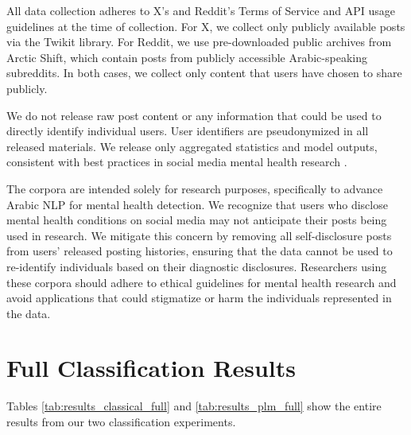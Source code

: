 \documentclass[11pt]{article}
\begin{document}
All data collection adheres to X's and Reddit's Terms of Service and API usage guidelines at the time of collection. For X, we collect only publicly available posts via the Twikit library. For Reddit, we use pre-downloaded public archives from Arctic Shift, which contain posts from publicly accessible Arabic-speaking subreddits. In both cases, we collect only content that users have chosen to share publicly.

We do not release raw post content or any information that could be used to directly identify individual users. User identifiers are pseudonymized in all released materials. We release only aggregated statistics and model outputs, consistent with best practices in social media mental health research \cite{harrigian2021state}.

The corpora are intended solely for research purposes, specifically to advance Arabic NLP for mental health detection. We recognize that users who disclose mental health conditions on social media may not anticipate their posts being used in research. We mitigate this concern by removing all self-disclosure posts from users' released posting histories, ensuring that the data cannot be used to re-identify individuals based on their diagnostic disclosures. Researchers using these corpora should adhere to ethical guidelines for mental health research and avoid applications that could stigmatize or harm the individuals represented in the data.


%


\appendix

\section{Full Classification Results}
Tables \ref{tab:results_classical_full} and \ref{tab:results_plm_full} show the entire results from our two classification experiments.

\label{app:full_results}



\end{document}

